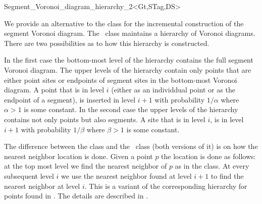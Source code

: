 


\begin{ccRefClass}{Segment_Voronoi_diagram_hierarchy_2<Gt,STag,DS>}

\ccDefinition

We provide an alternative to the class
 for the incremental
construction of the segment Voronoi diagram. The \ccRefName\ class
maintains a hierarchy of Voronoi diagrams. There are two possibilities
as to how this hierarchy is constructed.

In the first case the bottom-most level of the hierarchy contains the
full segment Voronoi diagram. The upper levels of the hierarchy
contain only points that are either point sites or endpoints of
segment sites in the bottom-most Voronoi diagram. 
A point that is in level $i$ (either as an individdual point or as the
endpoint of a segment), is inserted in level $i+1$ with probability
$1/\alpha$ where $\alpha>1$ is some constant.
In the second case the upper levels of the hierarchy contains not only
points but also segments. A site that is in level $i$, is in level
$i+1$ with probability $1/\beta$ where $\beta > 1$ is some constant.

The difference between the 
class and the \ccRefName\ class (both versions of it) is on how the
nearest neighbor location is done. Given a point $p$ the location is
done as follows: at the top most level we find the nearest neighbor of
$p$ as in the  class. At
every subsequent level $i$ we use the nearest neighbor found at level
$i+1$ to find the nearest neighbor at level $i$. This is a variant of
the corresponding hierarchy for points found in \cite{d-iirdt-98}. The
details are described in \cite{cgal:k-reisv-04}.


\end{ccRefClass}
